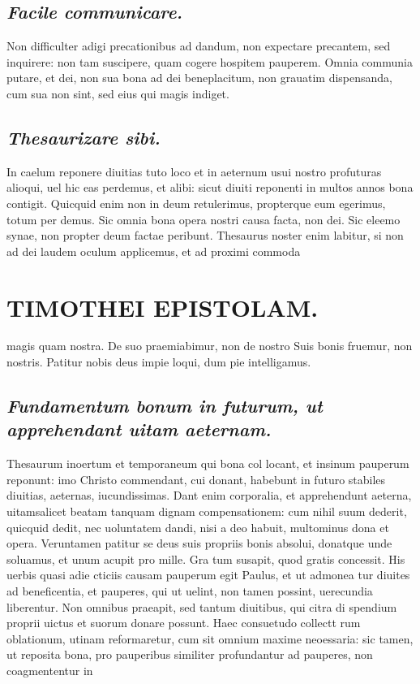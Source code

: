 \documentclass{article}
\begin{document}
\begin{pages}
\subsection*{\textit{Facile communicare. }}\pstart Non difficulter adigi precationibus ad dandum, non expectare precantem, sed inquirere: non tam suscipere, quam cogere hospitem pauperem. Omnia communia putare, et dei, non sua bona ad dei beneplacitum, non grauatim dispensanda, cum sua non sint, sed eius qui magis indiget.  \pend
{}
{}
\subsection*{\textit{Thesaurizare sibi. }}\pstart In caelum reponere diuitias tuto loco et in aeternum usui nostro profuturas alioqui, uel hic eas perdemus, et alibi: sicut diuiti reponenti in multos annos bona contigit. Quicquid enim non in deum retulerimus, propterque eum egerimus, totum per demus. Sic omnia bona opera nostri causa facta, non dei. Sic eleemo synae, non propter deum factae peribunt. Thesaurus noster enim labitur, si non ad dei laudem oculum applicemus, et ad proximi commoda  \pend
\section*{TIMOTHEI EPISTOLAM. }
\marginpar{[ p.185 ]}\pstart magis quam nostra. De suo praemiabimur, non de nostro Suis bonis fruemur, non nostris. Patitur nobis deus impie loqui, dum pie intelligamus.  \pend
{}
{}
\subsection*{\textit{Fundamentum bonum in futurum, ut apprehendant uitam aeternam. }}\pstart Thesaurum inoertum et temporaneum qui bona col locant, et insinum pauperum reponunt: imo Christo commendant, cui donant, habebunt in futuro stabiles diuitias, aeternas, iucundissimas. Dant enim corporalia, et apprehendunt aeterna, uitamsalicet beatam tanquam dignam compensationem: cum nihil suum dederit, quicquid dedit, nec uoluntatem dandi, nisi a deo habuit, multominus dona et opera. Veruntamen patitur se deus suis propriis bonis absolui, donatque unde soluamus, et unum acupit pro mille. Gra tum susapit, quod gratis concessit. His uerbis quasi adie cticiis causam pauperum egit Paulus, et ut admonea tur diuites ad beneficentia, et pauperes, qui ut uelint, non tamen possint, uerecundia liberentur. Non omnibus praeapit, sed tantum diuitibus, qui citra di spendium proprii uictus et suorum donare possunt. Haec consuetudo collectt rum oblationum, utinam reformaretur, cum sit omnium maxime neoessaria: sic tamen, ut reposita bona, pro pauperibus similiter profundantur ad pauperes, non coagmententur in  \pend

\end{pages}
\end{document}
